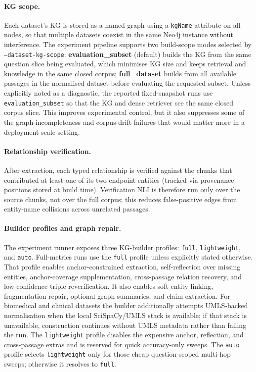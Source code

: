 \paragraph{KG scope.}
Each dataset's KG is stored as a named graph using a \texttt{kgName}
attribute on all nodes, so that multiple datasets coexist in the same
Neo4j instance without interference.
The experiment pipeline supports two build-scope modes selected by
\texttt{--dataset-kg-scope}: \textbf{evaluation\_subset} (default)
builds the KG from the same question slice being evaluated, which
minimises KG size and keeps retrieval and knowledge in the same closed
corpus; \textbf{full\_dataset} builds from all available passages in
the normalised dataset before evaluating the requested subset.
Unless explicitly noted as a diagnostic, the reported fixed-snapshot runs use
\texttt{evaluation\_subset} so that the KG and dense retriever see the same
closed corpus slice.
This improves experimental control, but it also suppresses some of the
graph-incompleteness and corpus-drift failures that would matter more in a
deployment-scale setting.

\paragraph{Relationship verification.}
After extraction, each typed relationship is verified against the chunks
that contributed at least one of its two endpoint entities (tracked via
provenance positions stored at build time).
Verification NLI is therefore run only over the source chunks, not over
the full corpus; this reduces false-positive edges from entity-name
collisions across unrelated passages.

\paragraph{Builder profiles and graph repair.}
The experiment runner exposes three KG-builder profiles:
\texttt{full}, \texttt{lightweight}, and \texttt{auto}.
Full-metrics runs use the \texttt{full} profile unless explicitly stated
otherwise.
That profile enables anchor-constrained extraction, self-reflection over
missing entities, anchor-coverage supplementation, cross-passage relation
recovery, and low-confidence triple reverification.
It also enables soft entity linking, fragmentation repair, optional graph
summaries, and claim extraction.
	For biomedical and clinical datasets the builder additionally attempts UMLS-backed
normalisation when the local SciSpaCy/UMLS stack is available; if that stack
is unavailable, construction continues without UMLS metadata rather than
failing the run.
The \texttt{lightweight} profile disables the expensive anchor, reflection,
and cross-passage extras and is reserved for quick accuracy-only sweeps.
The \texttt{auto} profile selects \texttt{lightweight} only for those cheap
question-scoped multi-hop sweeps; otherwise it resolves to \texttt{full}.

